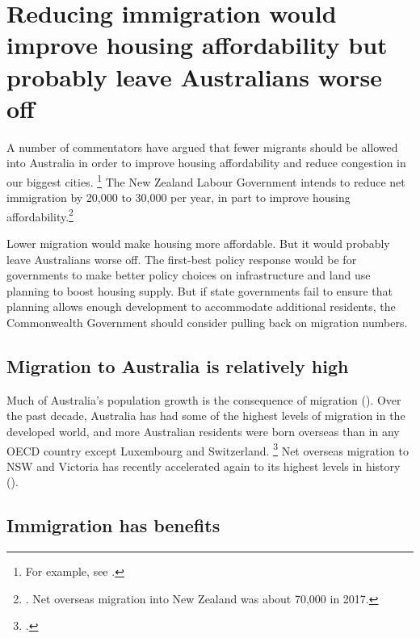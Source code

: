 \section{Reducing immigration would improve housing affordability but probably leave Australians worse off}\label{sec:reducing-immigration-would-improve-housing-affordability-but-probably-leave-australians-worse-off}

A number of commentators have argued that fewer migrants should be allowed into Australia in order to improve housing affordability and reduce congestion in our biggest cities.%
    \footnote{For example, see \textcites{Abbott_2018_sydney_institute_immigration}{Hunter-2017-SMH-Tony-Abbott-sez-cut-immi-let-1st-home-buyers-raid-super}{Sloan-2017-theOz-Cut-immi-by-half-for-housing-affordability}{Trembath-2016-ABC-BobCarr-sez-few-immigrants}{Smith2017Westpac}.}
The New Zealand Labour Government intends to reduce net immigration by 20,000 to 30,000 per year, in part to improve housing affordability.\footnote{\textcite{NZ_Labour_2018_immigration}. Net overseas migration into New Zealand was about 70,000 in 2017.}

Lower migration would make housing more affordable.
But it would probably leave Australians worse off.
The first-best policy response would be for governments to make better policy choices on infrastructure and land use planning to boost housing supply.
But if state governments fail to ensure that planning allows enough development to accommodate additional residents, the Commonwealth Government should consider pulling back on migration numbers.

\subsection{Migration to Australia is relatively high }\label{subsec:migration-to-australia-is-relatively-high}

Much of Australia's population growth is the consequence of migration ().
Over the past decade, Australia has had some of the highest levels of migration in the developed world, and more Australian residents were born overseas than in any OECD country except Luxembourg and Switzerland.%
	\footcites{OECD2017Migration}[][59]{CommissionMigrantIntake2016}
Net overseas migration to NSW and Victoria has recently accelerated again to its highest levels 
in history (). 

\subsection{Immigration has benefits}\label{subsec:immigration-has-benefits-and-costs}

